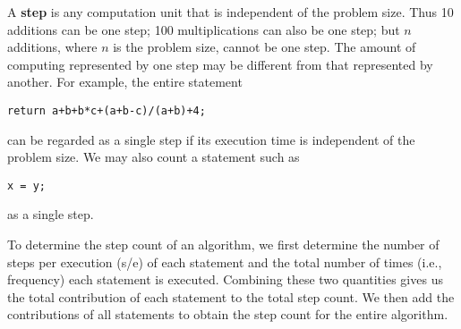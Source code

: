 A {\bf step} is any
computation unit that is independent of
the problem size.  Thus 10 additions
can be one step; 100 multiplications can
also be one step; but $n$ additions, where $n$ is the problem
size, cannot be one step.
The amount of computing represented by one step may be
different from that represented by another.
For example, the entire statement

\begin{verbatim}
return a+b+b*c+(a+b-c)/(a+b)+4;
\end{verbatim}
can be regarded as a single step if its execution time is
independent of the problem size.
We may also count a statement
such as

\begin{verbatim}
x = y;
\end{verbatim}
as a single step.
 
To determine the step count of an algorithm, we first determine
the number of steps per
execution (s/e) of each statement
and the total number
of times (i.e., frequency) each statement is executed.
Combining these two quantities gives us the total contribution of
each statement to the total step count.  We then add the contributions
of all statements to obtain the step count for the entire algorithm.
 
